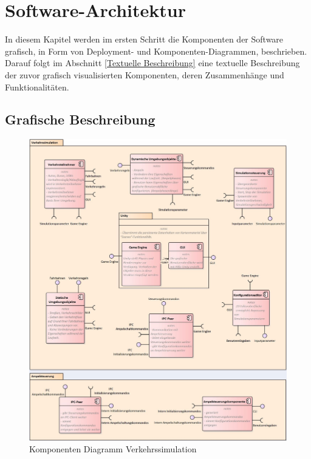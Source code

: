 
\chapter{Software-Architektur}
\label{Software-Architektur}

In diesem Kapitel werden im ersten Schritt die Komponenten der Software grafisch, in Form von Deployment- und Komponenten-Diagrammen, beschrieben. Darauf folgt im Abschnitt \ref{Textuelle Beschreibung} eine textuelle Beschreibung der zuvor grafisch visualisierten Komponenten, deren Zusammenhänge und Funktionalitäten.

\thispagestyle{standard}
\pagestyle{standard}

\section{Grafische Beschreibung}
\label{Grafische Beschreibung}

\begin{figure}[H]
\begin{center}
	\includegraphics[scale=0.673]{BilderAllgemein/Komponentdiagram.JPG}
\end{center}
	\caption{Komponenten Diagramm Verkehrssimulation}
\end{figure}

